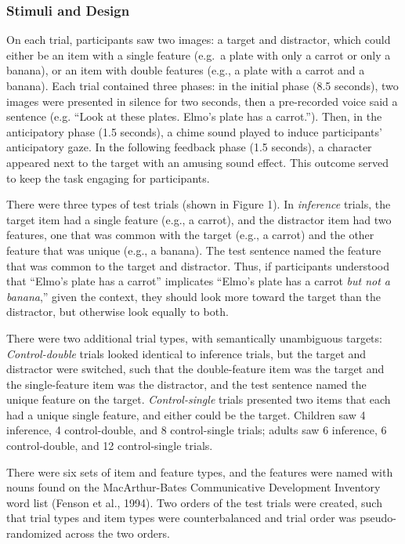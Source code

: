 \documentclass[a4paper,man,apacite,floatsintext]{apa6}
\begin{document}
\subsubsection{Stimuli and Design}\label{stimuli-and-design}

On each trial, participants saw two images: a target and distractor,
which could either be an item with a single feature (e.g.~a plate with
only a carrot or only a banana), or an item with double features (e.g.,
a plate with a carrot and a banana). Each trial contained three phases:
in the initial phase (8.5 seconds), two images were presented in silence
for two seconds, then a pre-recorded voice said a sentence (e.g. ``Look
at these plates. Elmo's plate has a carrot.''). Then, in the
anticipatory phase (1.5 seconds), a chime sound played to induce
participants' anticipatory gaze. In the following feedback phase (1.5
seconds), a character appeared next to the target with an amusing sound
effect. This outcome served to keep the task engaging for participants.

There were three types of test trials (shown in Figure 1). In
\emph{inference} trials, the target item had a single feature (e.g., a
carrot), and the distractor item had two features, one that was common
with the target (e.g., a carrot) and the other feature that was unique
(e.g., a banana). The test sentence named the feature that was common to
the target and distractor. Thus, if participants understood that
``Elmo's plate has a carrot'' implicates ``Elmo's plate has a carrot
\emph{but not a banana},'' given the context, they should look more
toward the target than the distractor, but otherwise look equally to
both.

There were two additional trial types, with semantically unambiguous
targets: \emph{Control-double} trials looked identical to inference
trials, but the target and distractor were switched, such that the
double-feature item was the target and the single-feature item was the
distractor, and the test sentence named the unique feature on the
target. \emph{Control-single} trials presented two items that each had a
unique single feature, and either could be the target. Children saw 4
inference, 4 control-double, and 8 control-single trials; adults saw 6
inference, 6 control-double, and 12 control-single trials.

There were six sets of item and feature types, and the features were
named with nouns found on the MacArthur-Bates Communicative Development
Inventory word list (Fenson et al., 1994). Two orders of the test trials
were created, such that trial types and item types were counterbalanced
and trial order was pseudo-randomized across the two orders.
\end{document}
